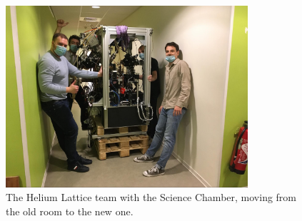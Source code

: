\renewcommand{\thefigure}{2}

\begin{figure}
    \centering
    \includegraphics[width=0.8\textwidth]{Fig/Conclusion/SC_moving.jpg}
    \caption{The Helium Lattice team with the Science Chamber, moving from the old room to the new one.}
    \label{fig:SC_moving}
\end{figure}



